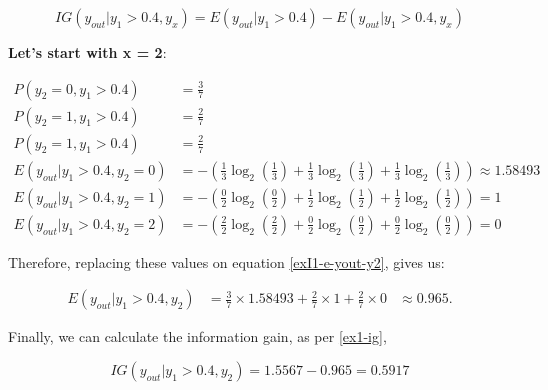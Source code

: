 \documentclass[12pt]{article}
\begin{document}
\begin{enumerate}[leftmargin=\labelsep]
    \begin{equation}\label{ex1-ig}
        IG(y_{out} |y_1 > 0.4, y_x) = E(y_{out} |y_1 > 0.4) - E(y_{out} |y_1 > 0.4, y_x)
    \end{equation}

    \textbf{Let's start with x = 2}:

    \[
        \begin{aligned}
            P(y_2 = 0, y_1 > 0.4)          & = \frac{3}{7}                                                                                       \\
            P(y_2 = 1, y_1 > 0.4)          & = \frac{2}{7}                                                                                       \\
            P(y_2 = 1, y_1 > 0.4)          & = \frac{2}{7}                                                                                       \\
            E(y_{out} | y_1 > 0.4 , y_2 = 0) & = - \left(\frac{1}{3} \log_2\left(\frac{1}{3}\right) + \frac{1}{3} \log_2\left(\frac{1}{3}\right)
                + \frac{1}{3} \log_2\left(\frac{1}{3}\right)\right) \approx 1.58493                                                              \\
            E(y_{out} | y_1 > 0.4 , y_2 = 1) & = - \left(\frac{0}{2} \log_2\left(\frac{0}{2}\right) + \frac{1}{2} \log_2\left(\frac{1}{2}\right)
                + \frac{1}{2} \log_2\left(\frac{1}{2}\right)\right) = 1                                                                          \\
            E(y_{out} | y_1 > 0.4 , y_2 = 2) & = - \left(\frac{2}{2} \log_2\left(\frac{2}{2}\right) + \frac{0}{2} \log_2\left(\frac{0}{2}\right)
                + \frac{0}{2} \log_2\left(\frac{0}{2}\right)\right) = 0
        \end{aligned}
    \]

    Therefore, replacing these values on equation \eqref{exI1-e-yout-y2}, gives us:

    \[
        \begin{aligned}
            E(y_{out} | y_1>0.4, y_2) & = \frac{3}{7} \times 1.58493 + \frac{2}{7} \times 1 + \frac{2}{7} \times 0 & \approx 0.965.
        \end{aligned}
    \]

    Finally, we can calculate the information gain, as per \eqref{ex1-ig},

    \[
        IG(y_{out} |y_1 > 0.4, y_{2}) = 1.5567 - 0.965 = 0.5917
    \]


\end{enumerate}
\end{document}
